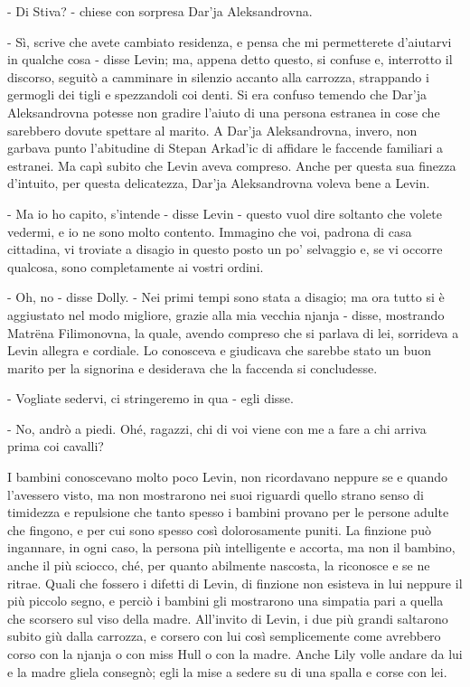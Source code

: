 - Di Stiva? - chiese con sorpresa Dar'ja Aleksandrovna. 

- Sì, scrive che avete cambiato residenza, e pensa che mi permetterete d'aiutarvi in qualche cosa - disse Levin; ma, appena detto questo, si confuse e, interrotto il discorso, seguitò a camminare in silenzio accanto alla carrozza, strappando i germogli dei tigli e spezzandoli coi denti. Si era confuso temendo che Dar'ja Aleksandrovna potesse non gradire l'aiuto di una persona estranea in cose che sarebbero dovute spettare al marito. A Dar'ja Aleksandrovna, invero, non garbava punto l'abitudine di Stepan Arkad'ic di affidare le faccende familiari a estranei. Ma capì subito che Levin aveva compreso. Anche per questa sua finezza d'intuito, per questa delicatezza, Dar'ja Aleksandrovna voleva bene a Levin. 

- Ma io ho capito, s'intende - disse Levin - questo vuol dire soltanto che volete vedermi, e io ne sono molto contento. Immagino che voi, padrona di casa cittadina, vi troviate a disagio in questo posto un po' selvaggio e, se vi occorre qualcosa, sono completamente ai vostri ordini. 

- Oh, no - disse Dolly. - Nei primi tempi sono stata a disagio; ma ora tutto si è aggiustato nel modo migliore, grazie alla mia vecchia njanja - disse, mostrando Matrëna Filimonovna, la quale, avendo compreso che si parlava di lei, sorrideva a Levin allegra e cordiale. Lo conosceva e giudicava che sarebbe stato un buon marito per la signorina e desiderava che la faccenda si concludesse. 

- Vogliate sedervi, ci stringeremo in qua - egli disse. 

- No, andrò a piedi. Ohé, ragazzi, chi di voi viene con me a fare a chi arriva prima coi cavalli? 

I bambini conoscevano molto poco Levin, non ricordavano neppure se e quando l'avessero visto, ma non mostrarono nei suoi riguardi quello strano senso di timidezza e repulsione che tanto spesso i bambini provano per le persone adulte che fingono, e per cui sono spesso così dolorosamente puniti. La finzione può ingannare, in ogni caso, la persona più intelligente e accorta, ma non il bambino, anche il più sciocco, ché, per quanto abilmente nascosta, la riconosce e se ne ritrae. Quali che fossero i difetti di Levin, di finzione non esisteva in lui neppure il più piccolo segno, e perciò i bambini gli mostrarono una simpatia pari a quella che scorsero sul viso della madre. All'invito di Levin, i due più grandi saltarono subito giù dalla carrozza, e corsero con lui così semplicemente come avrebbero corso con la njanja o con miss Hull o con la madre. Anche Lily volle andare da lui e la madre gliela consegnò; egli la mise a sedere su di una spalla e corse con lei. 

